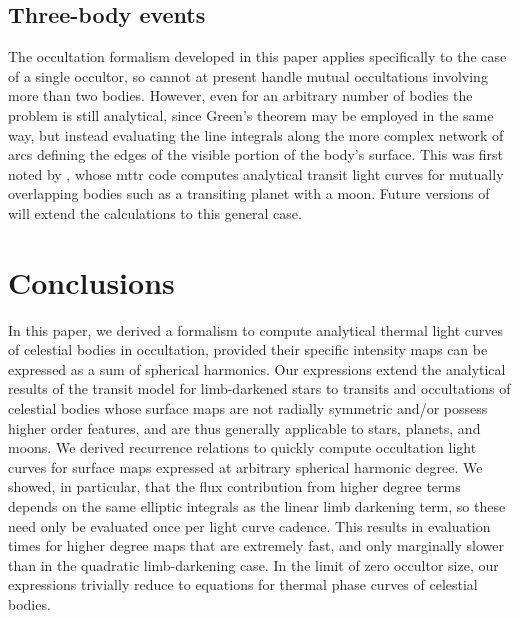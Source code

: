 \documentclass[modern]{aastex61}
\begin{document}
\subsection{Three-body events}
The occultation formalism developed in this paper applies specifically to the
case of a single occultor, so \starry cannot at present handle mutual occultations
involving more than two bodies. However, even for an arbitrary number of bodies
the problem is still analytical, since Green's theorem may be employed in the same
way, but instead evaluating the line integrals along the more complex network of
arcs defining the edges of the visible portion of the body's surface. This was
first noted by \cite{Pal2012}, whose \textsf{mttr} code computes analytical
transit light curves for mutually overlapping bodies such as a transiting
planet with a moon. Future versions of \starry will extend the calculations
to this general case.

\section{Conclusions}
\label{sec:conclusions}

In this paper, we derived a formalism to compute analytical thermal light curves of celestial
bodies in occultation, provided their specific intensity maps can be expressed as a sum
of spherical harmonics. Our expressions extend the analytical results of the
\citet{MandelAgol2002} transit model for limb-darkened stars to transits and
occultations of celestial bodies whose surface maps are not radially symmetric
and/or possess higher order features, and are thus generally applicable to
stars, planets, and moons. We derived recurrence relations to quickly compute
occultation light curves for surface maps expressed at arbitrary spherical harmonic degree.
We showed, in particular, that the flux contribution from higher degree terms
depends on the same elliptic integrals as the linear limb darkening term,
so these need only be evaluated once per light curve cadence. This results in
evaluation times for higher degree maps that are extremely fast, and
only marginally slower than in the quadratic limb-darkening case.
In the limit of zero occultor size, our expressions trivially reduce to equations
for thermal phase curves of celestial bodies.
\end{document}
